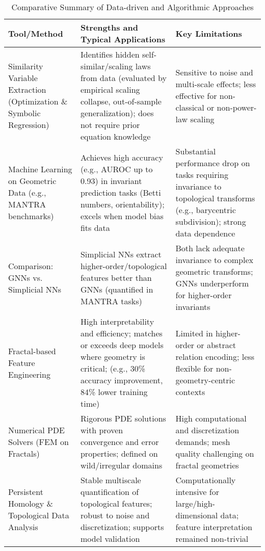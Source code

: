 \documentclass[sigconf]{acmart}
\begin{document}
\begin{table*}[htbp]
\centering
\caption{Comparative Summary of Data-driven and Algorithmic Approaches}
\label{tab:data_driven_methods}
\begin{adjustbox}{max width=\textwidth}
\begin{tabular}{lll}
\toprule
\textbf{Tool/Method} & \textbf{Strengths and Typical Applications} & \textbf{Key Limitations} \\
\midrule
Similarity Variable Extraction (Optimization \& Symbolic Regression) & Identifies hidden self-similar/scaling laws from data (evaluated by empirical scaling collapse, out-of-sample generalization); does not require prior equation knowledge & Sensitive to noise and multi-scale effects; less effective for non-classical or non-power-law scaling \\
Machine Learning on Geometric Data (e.g., MANTRA benchmarks) & Achieves high accuracy (e.g., AUROC up to 0.93) in invariant prediction tasks (Betti numbers, orientability); excels when model bias fits data & Substantial performance drop on tasks requiring invariance to topological transforms (e.g., barycentric subdivision); strong data dependence \\
Comparison: GNNs vs. Simplicial NNs & Simplicial NNs extract higher-order/topological features better than GNNs (quantified in MANTRA tasks) & Both lack adequate invariance to complex geometric transforms; GNNs underperform for higher-order invariants \\
Fractal-based Feature Engineering & High interpretability and efficiency; matches or exceeds deep models where geometry is critical; (e.g., 30\% accuracy improvement, 84\% lower training time) & Limited in higher-order or abstract relation encoding; less flexible for non-geometry-centric contexts \\
Numerical PDE Solvers (FEM on Fractals) & Rigorous PDE solutions with proven convergence and error properties; defined on wild/irregular domains & High computational and discretization demands; mesh quality challenging on fractal geometries \\
Persistent Homology \& Topological Data Analysis & Stable multiscale quantification of topological features; robust to noise and discretization; supports model validation & Computationally intensive for large/high-dimensional data; feature interpretation remained non-trivial \\
\bottomrule
\end{tabular}
\end{adjustbox}
\end{table*}
\end{document}
